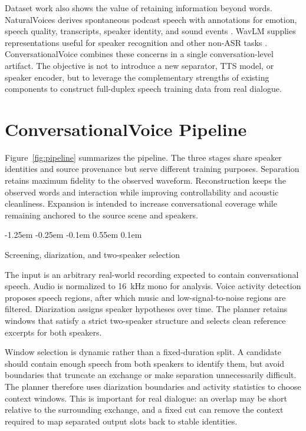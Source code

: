 \documentclass[10pt,twocolumn]{article}
\makeatletter
\renewcommand\subsection{%
  \@startsection{subsection}{2}{\z@}%
    {-1.25em \@plus -0.25em \@minus -0.1em}%
    {0.55em \@plus 0.1em}%
    {\normalfont\fontsize{10.5}{12.5}\selectfont\bfseries\raggedright
     \hyphenpenalty=10000\exhyphenpenalty=10000}}
\newcommand{\system}{\textsf{ConversationalVoice}\xspace}
\makeatother
\begin{document}
Dataset work also shows the value of retaining information beyond words. NaturalVoices derives spontaneous podcast speech with annotations for emotion, speech quality, transcripts, speaker identity, and sound events \citep{du2025naturalvoices}. WavLM supplies representations useful for speaker recognition and other non-ASR tasks \citep{chen2022wavlm}. \system combines these concerns in a single conversation-level artifact. The objective is not to introduce a new separator, TTS model, or speaker encoder, but to leverage the complementary strengths of existing components to construct full-duplex speech training data from real dialogue.

\section{ConversationalVoice Pipeline}

Figure~\ref{fig:pipeline} summarizes the pipeline. The three stages share speaker identities and source provenance but serve different training purposes. Separation retains maximum fidelity to the observed waveform. Reconstruction keeps the observed words and interaction while improving controllability and acoustic cleanliness. Expansion is intended to increase conversational coverage while remaining anchored to the source scene and speakers.

\subsection{Screening, diarization, and two-speaker selection}

The input is an arbitrary real-world recording expected to contain conversational speech. Audio is normalized to 16~kHz mono for analysis. Voice activity detection proposes speech regions, after which music and low-signal-to-noise regions are filtered. Diarization assigns speaker hypotheses over time. The planner retains windows that satisfy a strict two-speaker structure and selects clean reference excerpts for both speakers.

Window selection is dynamic rather than a fixed-duration split. A candidate should contain enough speech from both speakers to identify them, but avoid boundaries that truncate an exchange or make separation unnecessarily difficult. The planner therefore uses diarization boundaries and activity statistics to choose context windows. This is important for real dialogue: an overlap may be short relative to the surrounding exchange, and a fixed cut can remove the context required to map separated output slots back to stable identities.
\end{document}
